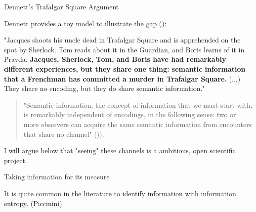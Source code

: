 \documentclass[10pt, aspectratio=169, handout]{beamer}
\begin{document}
\begin{frame}[label=trafalgar]{Dennett's Trafalgar Square Argument}
    
    Dennett provides a toy model to illustrate the gap (\cite{dennett_bacteria_2017}): 
    
    "Jacques shoots his uncle dead in Trafalgar Square and is apprehended on the spot by Sherlock. Tom reads about it in the Guardian, and Boris learns of it in Pravda.\textbf{ Jacques, Sherlock, Tom, and Boris have had remarkably different experiences, but they share one thing: semantic information that a Frenchman has committed a murder in Trafalgar Square.} (...) They share no encoding, but they do share semantic information."

    \bigskip
    
    \begin{quote}
    "Semantic information, the concept of information that we must start with, is remarkably independent of encodings, in the following sense: two or more observers can acquire the same semantic information from encounters that share no channel" ()\cite{dennett_bacteria_2017}). 
    \end{quote}

    I will argue below that "seeing" these channels is a ambitious, open scientific project.

\end{frame}



\begin{frame}{Taking information for its measure }

    It is quite common in the literature to identify information with information entropy.
    (Piccinini)

    

\end{frame}
\end{document}
